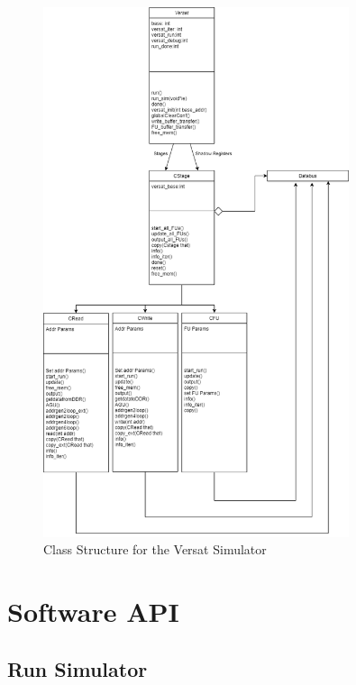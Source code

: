 \begin{figure}[!htbp]
    \centering
    \includegraphics[width=0.8\textwidth]{Figures/VersatSimulatorDraw.drawio.png}
    \caption{Class Structure for the Versat Simulator}
    \label{figure:VersatSimulatorClass}
\end{figure} 

\section{Software API}



\subsection{Run Simulator}

